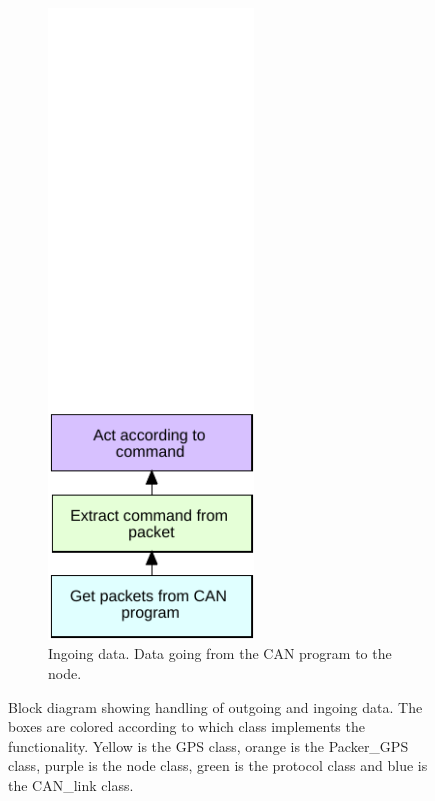 \begin{figure}[!h]
\begin{subfigure}{0.45\textwidth}
\includegraphics[width=0.60\textwidth]{graphics/FlowChart_Node_Unpacking}
\caption{Ingoing data. Data going from the CAN program to the node.}
\label{fig:filter_2}
\end{subfigure}
\caption{Block diagram showing handling of outgoing and ingoing data. The boxes are colored according to which class implements the functionality. Yellow is the GPS class, orange is the Packer\_GPS class, purple is the node class, green is the protocol class and blue is the CAN\_link class.}
\label{fig:flow_flow}
\end{figure}

